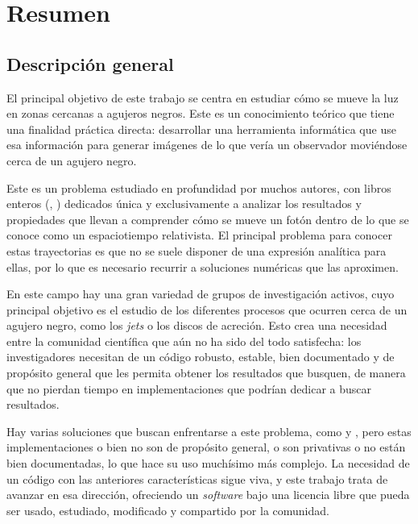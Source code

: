 \begingroup
\let\clearpage\relax
\let\cleardoublepage\relax
\let\cleardoublepage\relax

\chapter*{Resumen}

\section*{Descripción general}

El principal objetivo de este trabajo se centra en estudiar cómo se mueve la luz en zonas cercanas a agujeros negros. Este es un conocimiento teórico que tiene una finalidad práctica directa: desarrollar una herramienta informática que use esa información para generar imágenes de lo que vería un observador moviéndose cerca de un agujero negro.

Este es un problema estudiado en profundidad por muchos autores, con libros enteros (\cite{oneill83}, \cite{oneill95}) dedicados única y exclusivamente a analizar los resultados y propiedades que llevan a comprender cómo se mueve un fotón dentro de lo que se conoce como un espaciotiempo relativista. El principal problema para conocer estas trayectorias es que no se suele disponer de una expresión analítica para ellas, por lo que es necesario recurrir a soluciones numéricas que las aproximen.

En este campo hay una gran variedad de grupos de investigación activos, cuyo principal objetivo es el estudio de los diferentes procesos que ocurren cerca de un agujero negro, como los \emph{jets} o los discos de acreción. Esto crea una necesidad entre la comunidad científica que aún no ha sido del todo satisfecha: los investigadores necesitan de un código robusto, estable, bien documentado y de propósito general que les permita obtener los resultados que busquen, de manera que no pierdan tiempo en implementaciones que podrían dedicar a buscar resultados.

Hay varias soluciones que buscan enfrentarse a este problema, como \cite{thorne15} y \cite{chan13}, pero estas implementaciones o bien no son de propósito general, o son privativas o no están bien documentadas, lo que hace su uso muchísimo más complejo. La necesidad de un código con las anteriores características sigue viva, y este trabajo trata de avanzar en esa dirección, ofreciendo un \emph{software} bajo una licencia libre que pueda ser usado, estudiado, modificado y compartido por la comunidad.

